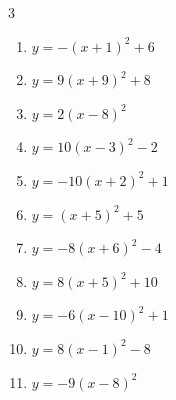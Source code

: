 \begin{multicols}{3}
\begin{enumerate}
        \phantom{$\displaystyle 頂点\left( -4 , -6 \right)$}

\columnbreak %

  \item $\displaystyle y=-\left( x+1\right)^{2}+6$

        \phantom{$\displaystyle 頂点\left( -1 , 6 \right)$}

  \item $\displaystyle y=9\left( x+9\right)^{2}+8$

        \phantom{$\displaystyle 頂点\left( -9 , 8 \right)$}

  \item $\displaystyle y=2\left( x-8\right)^{2}$

        \phantom{$\displaystyle 頂点\left( 8 , 0 \right)$}

  \item $\displaystyle y=10\left( x-3\right)^{2}-2$

        \phantom{$\displaystyle 頂点\left( 3 , -2 \right)$}

  \item $\displaystyle y=-10\left( x+2\right)^{2}+1$

        \phantom{$\displaystyle 頂点\left( -2 , 1 \right)$}

  \item $\displaystyle y=\left( x+5\right)^{2}+5$

        \phantom{$\displaystyle 頂点\left( -5 , 5 \right)$}

  \item $\displaystyle y=-8\left( x+6\right)^{2}-4$

        \phantom{$\displaystyle 頂点\left( -6 , -4 \right)$}

  \item $\displaystyle y=8\left( x+5\right)^{2}+10$

        \phantom{$\displaystyle 頂点\left( -5 , 10 \right)$}

  \item $\displaystyle y=-6\left( x-10\right)^{2}+1$

        \phantom{$\displaystyle 頂点\left( 10 , 1 \right)$}

  \item $\displaystyle y=8\left( x-1\right)^{2}-8$

        \phantom{$\displaystyle 頂点\left( 1 , -8 \right)$}

  \item $\displaystyle y=-9\left( x-8\right)^{2}$


\end{enumerate}
\end{multicols}
